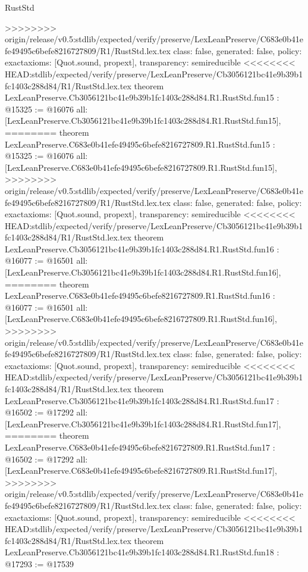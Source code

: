 \begin{lexlean}{RustStd}
\begin{coremodule}
{\begin{coremodule}
{{{{{{{{{{{{{{{{{{>>>>>>>> origin/release/v0.5:stdlib/expected/verify/preserve/LexLeanPreserve/C683e0b41efe49495c6befe8216727809/R1/RustStd.lex.tex
  class: false,
  generated: false,
  policy: exact{axioms: [Quot.sound, propext]},
  transparency: semireducible
}
<<<<<<<< HEAD:stdlib/expected/verify/preserve/LexLeanPreserve/Cb3056121bc41e9b39b1fc1403c288d84/R1/RustStd.lex.tex
theorem LexLeanPreserve.Cb3056121bc41e9b39b1fc1403c288d84.R1.RustStd.fun15 : @15325 := @16076 {
  all: [LexLeanPreserve.Cb3056121bc41e9b39b1fc1403c288d84.R1.RustStd.fun15],
========
theorem LexLeanPreserve.C683e0b41efe49495c6befe8216727809.R1.RustStd.fun15 : @15325 := @16076 {
  all: [LexLeanPreserve.C683e0b41efe49495c6befe8216727809.R1.RustStd.fun15],
>>>>>>>> origin/release/v0.5:stdlib/expected/verify/preserve/LexLeanPreserve/C683e0b41efe49495c6befe8216727809/R1/RustStd.lex.tex
  class: false,
  generated: false,
  policy: exact{axioms: [Quot.sound, propext]},
  transparency: semireducible
}
<<<<<<<< HEAD:stdlib/expected/verify/preserve/LexLeanPreserve/Cb3056121bc41e9b39b1fc1403c288d84/R1/RustStd.lex.tex
theorem LexLeanPreserve.Cb3056121bc41e9b39b1fc1403c288d84.R1.RustStd.fun16 : @16077 := @16501 {
  all: [LexLeanPreserve.Cb3056121bc41e9b39b1fc1403c288d84.R1.RustStd.fun16],
========
theorem LexLeanPreserve.C683e0b41efe49495c6befe8216727809.R1.RustStd.fun16 : @16077 := @16501 {
  all: [LexLeanPreserve.C683e0b41efe49495c6befe8216727809.R1.RustStd.fun16],
>>>>>>>> origin/release/v0.5:stdlib/expected/verify/preserve/LexLeanPreserve/C683e0b41efe49495c6befe8216727809/R1/RustStd.lex.tex
  class: false,
  generated: false,
  policy: exact{axioms: [Quot.sound, propext]},
  transparency: semireducible
}
<<<<<<<< HEAD:stdlib/expected/verify/preserve/LexLeanPreserve/Cb3056121bc41e9b39b1fc1403c288d84/R1/RustStd.lex.tex
theorem LexLeanPreserve.Cb3056121bc41e9b39b1fc1403c288d84.R1.RustStd.fun17 : @16502 := @17292 {
  all: [LexLeanPreserve.Cb3056121bc41e9b39b1fc1403c288d84.R1.RustStd.fun17],
========
theorem LexLeanPreserve.C683e0b41efe49495c6befe8216727809.R1.RustStd.fun17 : @16502 := @17292 {
  all: [LexLeanPreserve.C683e0b41efe49495c6befe8216727809.R1.RustStd.fun17],
>>>>>>>> origin/release/v0.5:stdlib/expected/verify/preserve/LexLeanPreserve/C683e0b41efe49495c6befe8216727809/R1/RustStd.lex.tex
  class: false,
  generated: false,
  policy: exact{axioms: [Quot.sound, propext]},
  transparency: semireducible
}
<<<<<<<< HEAD:stdlib/expected/verify/preserve/LexLeanPreserve/Cb3056121bc41e9b39b1fc1403c288d84/R1/RustStd.lex.tex
theorem LexLeanPreserve.Cb3056121bc41e9b39b1fc1403c288d84.R1.RustStd.fun18 : @17293 := @17539 {
}}}}}}}}}}}}}}}}}}}}}
\end{coremodule}}
\end{coremodule}
\end{lexlean}
